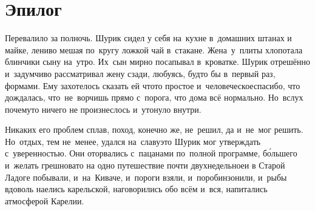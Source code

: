 
{
\cleardoublepage



\fancyhead[LE]{\fancyplain{}{}}
\fancyhead[RO]{\fancyplain{}{}}

\section*{Эпилог}


Перевалило за полночь. Шурик сидел у себя на~кухне в~домашних штанах и майке, лениво мешая по~кругу ложкой чай в~стакане. Жена~у~плиты хлопотала блинчики сыну на~утро. Их~сын мирно посапывал в~кроватке. Шурик отрешённо и~задумчиво рассматривал жену сзади, любуясь, будто бы в~первый раз, формами. Ему захотелось сказать ей что\sdash то простое и~человеческое\mdash спасибо, что дождалась, что~не~ворчишь прямо с~порога, что дома всё нормально. Но~вслух почему\sdash то ничего не произнеслось и~утонуло внутри.

Никаких его проблем сплав, поход, конечно же, не~решил, да и~не~мог решить. Но~отдых, тем не~менее, удался на~славу\mdash это Шурик мог утверждать с~уверенностью. Они оторвались с~пацанами по~полной программе, б\'{о}льшего и~желать грешновато на одно путешествие почти двухнедельное\mdash и в Старой Ладоге побывали, и~на~Киваче, и~пороги взяли, и~поробинзонили, и~рыбы вдоволь наелись карельской, наговорились обо всём и~вся, напитались атмосферой Карелии.

}
